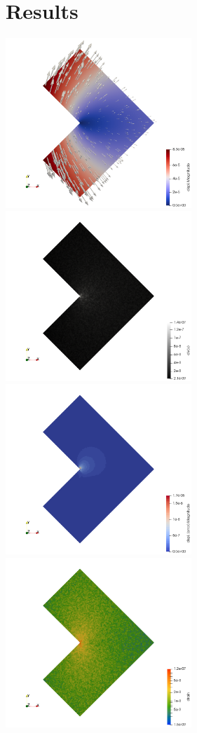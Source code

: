 \section*{Results}

\begin{center}
\includegraphics[width=7cm]{python_codes/fieldstone_179/RESULTS/disp}
\includegraphics[width=7cm]{python_codes/fieldstone_179/RESULTS/divv}\\
\includegraphics[width=7cm]{python_codes/fieldstone_179/RESULTS/error}
\includegraphics[width=7cm]{python_codes/fieldstone_179/RESULTS/strain}
\end{center}


